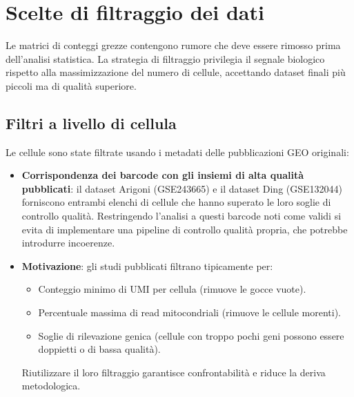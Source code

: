 \section{Scelte di filtraggio dei dati}

Le matrici di conteggi grezze contengono rumore che deve essere rimosso prima dell'analisi statistica. La strategia di filtraggio privilegia il segnale biologico rispetto alla massimizzazione del numero di cellule, accettando dataset finali più piccoli ma di qualità superiore.

\subsection*{Filtri a livello di cellula}

Le cellule sono state filtrate usando i metadati delle pubblicazioni GEO originali:

\begin{itemize}
    \item \textbf{Corrispondenza dei barcode con gli insiemi di alta qualità pubblicati}: il dataset Arigoni (GSE243665) e il dataset Ding (GSE132044\cite{ding2020systematic}) forniscono entrambi elenchi di cellule che hanno superato le loro soglie di controllo qualità. Restringendo l'analisi a questi barcode noti come validi si evita di implementare una pipeline di controllo qualità propria, che potrebbe introdurre incoerenze.
    \item \textbf{Motivazione}: gli studi pubblicati filtrano tipicamente per:
    \begin{itemize}
        \item Conteggio minimo di UMI per cellula (rimuove le gocce vuote).
        \item Percentuale massima di read mitocondriali (rimuove le cellule morenti).
        \item Soglie di rilevazione genica (cellule con troppo pochi geni possono essere doppietti o di bassa qualità).
    \end{itemize}
    Riutilizzare il loro filtraggio garantisce confrontabilità e riduce la deriva metodologica.
\end{itemize}


